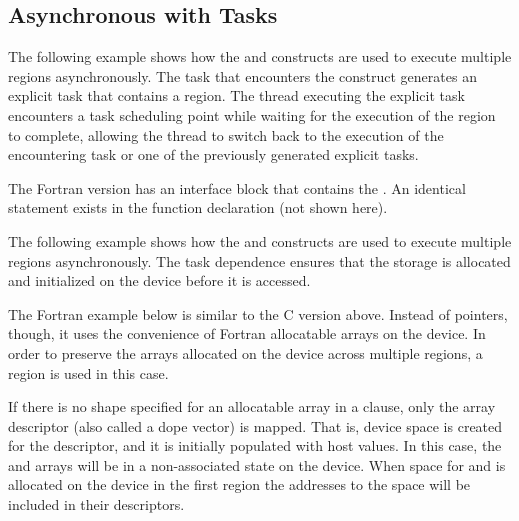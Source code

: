 \subsection{Asynchronous  with Tasks}
\label{subsec:async_target_with_tasks}



The following example shows how the  and  constructs 
are used to execute multiple  regions asynchronously. The task that 
encounters the  construct generates an explicit task that contains 
a  region. The thread executing the explicit task encounters a task 
scheduling point while waiting for the execution of the  region 
to complete, allowing the thread to switch back to the execution of the encountering 
task or one of the previously generated explicit tasks.


{}
The Fortran version has an interface block that contains the . 
An identical statement exists in the function declaration (not shown here).


The following example shows how the  and  constructs 
are used to execute multiple  regions asynchronously. The task dependence 
ensures that the storage is allocated and initialized on the device before it is 
accessed.


The Fortran example below is similar to the C version above. Instead of pointers, though, it uses
the convenience of Fortran allocatable arrays on the device. In order to preserve the arrays 
allocated on the device across multiple  regions, a  region 
is used in this case.

If there is no shape specified for an allocatable array in a  clause, only the array descriptor
(also called a dope vector) is mapped. That is, device space is created for the descriptor, and it
is initially populated with host values. In this case, the  and  arrays will be in a
non-associated state on the device. When space for  and  is allocated on the device
in the first  region the addresses to the space will be included in their descriptors.

